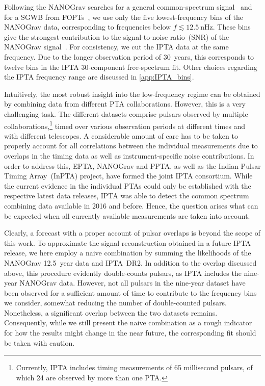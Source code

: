 \documentclass{article}
\begin{document}
Following the NANOGrav searches for a general common-spectrum signal~\cite{NANOGrav:2020bcs} and for a SGWB from FOPTs~\cite{NANOGrav:2021flc}, we use only the five lowest-frequency bins of the NANOGrav data, corresponding to frequencies below $f \lesssim \SI{12.5}{\nano\Hz}$.
These bins give the strongest contribution to the signal-to-noise ratio~(SNR) of the NANOGrav signal~\cite{NANOGrav:2020bcs}.
For consistency, we cut the IPTA data at the same frequency.
Due to the longer observation period of 30~years, this corresponds to twelve bins in the IPTA 30-component free-spectrum fit.
Other choices regarding the IPTA frequency range are discussed in \cref{app:IPTA_bins}.

Intuitively, the most robust insight into the low-frequency regime can be obtained by combining data from different PTA collaborations.
However, this is a very challenging task.
The different datasets comprise pulsars observed by multiple collaborations,\footnote{%
    Currently, IPTA includes timing measurements of 65 millisecond pulsars, of which 24 are observed by more than one PTA.
} 
timed over various observation periods at different times and with different telescopes.
A considerable amount of care has to be taken to properly account for all correlations between the individual measurements due to overlaps in the timing data as well as instrument-specific noise contributions. 
In order to address this, EPTA, NANOGrav and PPTA, as well as the Indian Pulsar Timing Array~(InPTA) project, have formed the joint IPTA consortium.
While the current evidence in the individual PTAs could only be established with the respective latest data releases, IPTA was able to detect the common spectrum combining data available in 2016 and before.
Hence, the question arises what can be expected when all currently available measurements are taken into account.

Clearly, a forecast with a proper account of pulsar overlaps is beyond the scope of this work.
To approximate the signal reconstruction obtained in a future IPTA release, we here employ a naive combination by summing the likelihoods of the NANOGrav 12.5~year data and IPTA~DR2.
In addition to the overlap discussed above, this procedure evidently double-counts pulsars, as IPTA includes the nine-year NANOGrav data.
However, not all pulsars in the nine-year dataset have been observed for a sufficient amount of time to contribute to the frequency bins we consider, somewhat reducing the number of double-counted pulsars.
Nonetheless, a significant overlap between the two datasets remains. 
Consequently, while we still present the naive combination as a rough indicator for how the results might change in the near future, the corresponding fit should be taken with caution.
\end{document}
